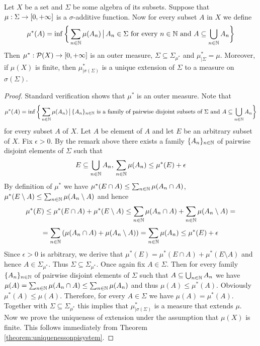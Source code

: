 \begin{theorem}\label{theorem:caratheodoryextensionresult}
Let $X$ be a set and $\Sigma$ be some algebra of its subsets. Suppose that $\mu:\Sigma\rightarrow [0,+\infty]$ is a $\sigma$-additive function. Now for every subset $A$ in $X$ we define
$$\mu^*(A) = \inf \bigg\{\sum_{n\in {\mathbb N}}\mu(A_n)\,\big|\,A_n\in \Sigma\mbox{ for every }n\in {\mathbb N}\mbox{ and }A\subseteq \bigcup_{n\in {\mathbb N}}A_n\bigg\}$$
Then $\mu^*:{\mathcal P}(X)\rightarrow [0,+\infty]$ is an outer measure, $\Sigma \subseteq \Sigma_{\mu^*}$ and $\mu^*_{\mid \Sigma} = \mu$. Moreover, if $\mu(X)$ is finite, then $\mu^*_{\mid \sigma(\Sigma)}$ is a unique extension of $\Sigma$ to a measure on $\sigma(\Sigma)$.
\end{theorem}
\begin{proof}
Standard verification shows that $\mu^*$ is an outer measure. Note that 
$$\mu^*(A) = \inf \bigg\{\sum_{n\in {\mathbb N}}\mu(A_n)\,\big|\,\{A_n\}_{n\in {\mathbb N}}\mbox{ is a family of pairwise disjoint subsets of }\Sigma \mbox{ and }A\subseteq \bigcup_{n\in {\mathbb N}}A_n\bigg\}$$
for every subset $A$ of $X$. Let $A$ be element of $A$ and let $E$ be an arbitrary subset of $X$. Fix $\epsilon > 0$. By the remark above there exists a family $\{A_n\}_{n\in {\mathbb N}}$ of pairwise disjoint elements of $\Sigma$ such that
$$E\subseteq \bigcup_{n\in {\mathbb N}}A_n,\,\sum_{n\in {\mathbb N}}\mu(A_n)\leq \mu^*(E)+\epsilon$$
By definition of $\mu^*$ we have $\mu^*(E\cap A)\leq \sum_{n\in {\mathbb N}}\mu(A_n\cap A)$, $\mu^*(E\setminus A) \leq \sum_{n\in {\mathbb N}}\mu(A_n\setminus A)$ and hence
$$\mu^*(E)\leq \mu^*(E\cap A)+\mu^*(E\setminus A) \leq \sum_{n\in {\mathbb N}}\mu(A_n\cap A)+\sum_{n\in {\mathbb N}}\mu(A_n\setminus A)=$$
$$=\sum_{n\in {\mathbb N}}\left(\mu(A_n\cap A)+\mu(A_n\setminus A)\right)=\sum_{n\in {\mathbb N}}\mu(A_n)\leq \mu^*(E)+\epsilon$$
Since $\epsilon > 0$ is arbitrary, we derive that $\mu^*(E) = \mu^*(E\cap A)+\mu^*(E\setminus A)$ and hence $A\in \Sigma_{\mu^*}$. Thus $\Sigma \subseteq \Sigma_{\mu^*}$. Once again fix $A\in \Sigma$. Then for every family $\{A_n\}_{n\in {\mathbb N}}$ of pairwise disjoint elements of $\Sigma$ such that $A\subseteq \bigcup_{n\in {\mathbb N}}A_n$ we have $\mu(A) = \sum_{n\in {\mathbb N}}\mu(A_n\cap A)\leq \sum_{n\in {\mathbb N}}\mu(A_n)$ and thus $\mu(A)\leq \mu^*(A)$. Obviously $\mu^*(A)\leq \mu(A)$. Therefore, for every $A\in \Sigma$ we have $\mu(A) = \mu^*(A)$. Together with $\Sigma\subseteq \Sigma_{\mu^*}$ this implies that $\mu^*_{\mid \sigma(\Sigma)}$ is a measure that extends $\mu$. Now we prove the uniqueness of extension under the assumption that $\mu(X)$ is finite. This follows immediately from Theorem \ref{theorem:uniquenessonpisystem}.
\end{proof}

